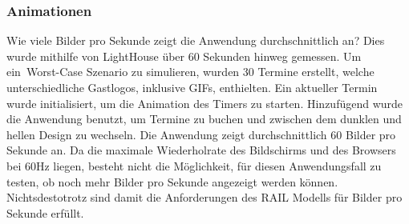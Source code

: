 \subsubsection{Animationen}\label{subsubsec:test-2}
\newline
\newline
Wie viele Bilder pro Sekunde zeigt die Anwendung durchschnittlich an?
Dies wurde mithilfe von LightHouse über 60 Sekunden hinweg gemessen.
\newline
Um ein~\gls{Worst-Case} Szenario zu simulieren, wurden 30 Termine erstellt, welche unterschiedliche Gastlogos, inklusive GIFs, enthielten.
Ein aktueller Termin wurde initialisiert, um die Animation des Timers zu starten.
Hinzufügend wurde die Anwendung benutzt, um Termine zu buchen und zwischen dem dunklen und hellen Design zu wechseln.
Die Anwendung zeigt durchschnittlich 60 Bilder pro Sekunde an.
Da die maximale Wiederholrate des Bildschirms und des Browsers bei 60Hz liegen, besteht nicht die Möglichkeit, für diesen Anwendungsfall zu testen, ob noch mehr Bilder pro Sekunde angezeigt werden können.
Nichtsdestotrotz sind damit die Anforderungen des RAIL Modells für Bilder pro Sekunde erfüllt.
\newline
\newline
